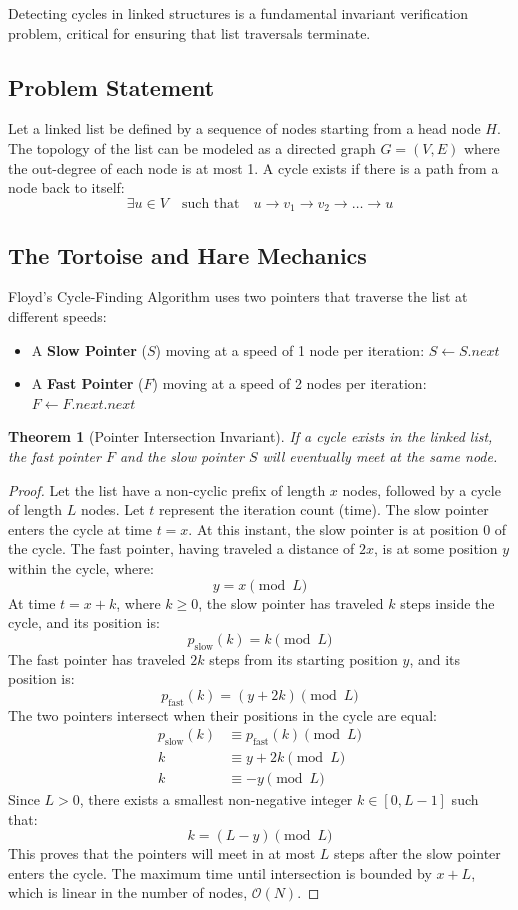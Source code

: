 \documentclass[10pt,journal,compsoc,onecolumn]{IEEEtran}
\newtheorem{theorem}{Theorem}
\begin{document}
Detecting cycles in linked structures is a fundamental invariant verification problem, critical for ensuring that list traversals terminate.

\subsection{Problem Statement}
Let a linked list be defined by a sequence of nodes starting from a head node $H$. The topology of the list can be modeled as a directed graph $G = (V, E)$ where the out-degree of each node is at most 1.
A cycle exists if there is a path from a node back to itself:
\[
\exists u \in V \quad \text{such that} \quad u \to v_1 \to v_2 \to \ldots \to u
\]

\subsection{The Tortoise and Hare Mechanics}
Floyd's Cycle-Finding Algorithm uses two pointers that traverse the list at different speeds:
\begin{itemize}
    \item A \textbf{Slow Pointer} ($S$) moving at a speed of 1 node per iteration: $S \leftarrow S.\textit{next}$
    \item A \textbf{Fast Pointer} ($F$) moving at a speed of 2 nodes per iteration: $F \leftarrow F.\textit{next}.\textit{next}$
\end{itemize}

\begin{theorem}[Pointer Intersection Invariant]
If a cycle exists in the linked list, the fast pointer $F$ and the slow pointer $S$ will eventually meet at the same node.
\end{theorem}
\begin{proof}
Let the list have a non-cyclic prefix of length $x$ nodes, followed by a cycle of length $L$ nodes.
Let $t$ represent the iteration count (time). The slow pointer enters the cycle at time $t = x$. At this instant, the slow pointer is at position 0 of the cycle.
The fast pointer, having traveled a distance of $2x$, is at some position $y$ within the cycle, where:
\[
y = x \pmod L
\]
At time $t = x + k$, where $k \ge 0$, the slow pointer has traveled $k$ steps inside the cycle, and its position is:
\[
p_{\text{slow}}(k) = k \pmod L
\]
The fast pointer has traveled $2k$ steps from its starting position $y$, and its position is:
\[
p_{\text{fast}}(k) = (y + 2k) \pmod L
\]
The two pointers intersect when their positions in the cycle are equal:
\begin{align*}
p_{\text{slow}}(k) &\equiv p_{\text{fast}}(k) \pmod L \\
k &\equiv y + 2k \pmod L \\
k &\equiv -y \pmod L
\end{align*}
Since $L > 0$, there exists a smallest non-negative integer $k \in [0, L-1]$ such that:
\[
k = (L - y) \pmod L
\]
This proves that the pointers will meet in at most $L$ steps after the slow pointer enters the cycle. The maximum time until intersection is bounded by $x + L$, which is linear in the number of nodes, $\mathcal{O}(N)$.
\end{proof}
\end{document}
